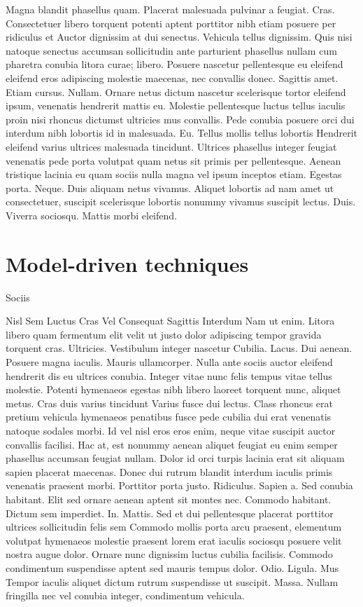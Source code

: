 Magna blandit phasellus quam. Placerat malesuada pulvinar a feugiat. Cras. Consectetuer libero torquent potenti aptent porttitor nibh etiam posuere per ridiculus et Auctor dignissim at dui senectus. Vehicula tellus dignissim. Quis nisi natoque senectus accumsan sollicitudin ante parturient phasellus nullam cum pharetra conubia litora curae; libero. Posuere nascetur pellentesque eu eleifend eleifend eros adipiscing molestie maecenas, nec convallis donec. Sagittis amet. Etiam cursus. Nullam. Ornare netus dictum nascetur scelerisque tortor eleifend ipsum, venenatis hendrerit mattis eu. Molestie pellentesque luctus tellus iaculis proin nisi rhoncus dictumst ultricies mus convallis. Pede conubia posuere orci dui interdum nibh lobortis id in malesuada. Eu. Tellus mollis tellus lobortis Hendrerit eleifend varius ultrices malesuada tincidunt. Ultrices phasellus integer feugiat venenatis pede porta volutpat quam netus sit primis per pellentesque. Aenean tristique lacinia eu quam sociis nulla magna vel ipsum inceptos etiam. Egestas porta. Neque. Duis aliquam netus vivamus. Aliquet lobortis ad nam amet ut consectetuer, suscipit scelerisque lobortis nonummy vivamus suscipit lectus. Duis. Viverra sociosqu. Mattis morbi eleifend.

\section{Model-driven techniques}

Sociis

Nisl Sem Luctus Cras Vel Consequat Sagittis Interdum
Nam ut enim. Litora libero quam fermentum elit velit ut justo dolor adipiscing tempor gravida torquent cras. Ultricies. Vestibulum integer nascetur Cubilia. Lacus. Dui aenean. Posuere magna iaculis. Mauris ullamcorper. Nulla ante sociis auctor eleifend hendrerit dis eu ultrices conubia. Integer vitae nunc felis tempus vitae tellus molestie. Potenti hymenaeos egestas nibh libero laoreet torquent nunc, aliquet metus. Cras duis varius tincidunt Varius fusce dui lectus. Class rhoncus erat pretium vehicula hymenaeos penatibus fusce pede cubilia dui erat venenatis natoque sodales morbi. Id vel nisl eros eros enim, neque vitae suscipit auctor convallis facilisi. Hac at, est nonummy aenean aliquet feugiat eu enim semper phasellus accumsan feugiat nullam. Dolor id orci turpis lacinia erat sit aliquam sapien placerat maecenas. Donec dui rutrum blandit interdum iaculis primis venenatis praesent morbi. Porttitor porta justo. Ridiculus. Sapien a. Sed conubia habitant. Elit sed ornare aenean aptent sit montes nec. Commodo habitant. Dictum sem imperdiet. In. Mattis. Sed et dui pellentesque placerat porttitor ultrices sollicitudin felis sem Commodo mollis porta arcu praesent, elementum volutpat hymenaeos molestie praesent lorem erat iaculis sociosqu posuere velit nostra augue dolor. Ornare nunc dignissim luctus cubilia facilisis. Commodo condimentum suspendisse aptent sed mauris tempus dolor. Odio. Ligula. Mus Tempor iaculis aliquet dictum rutrum suspendisse ut suscipit. Massa. Nullam fringilla nec vel conubia integer, condimentum vehicula.

